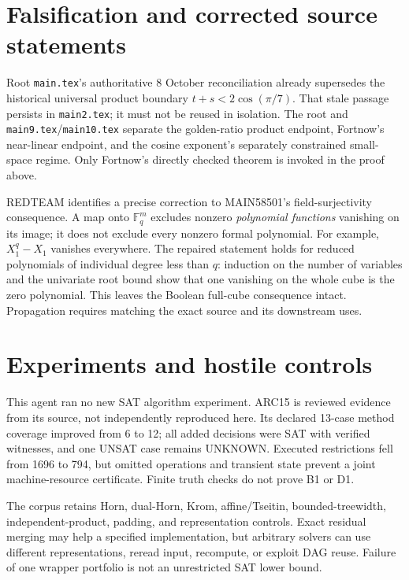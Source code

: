 \documentclass[11pt]{article}
\begin{document}
\section*{Falsification and corrected source statements}
Root \texttt{main.tex}'s authoritative 8 October reconciliation already
supersedes the historical universal product boundary
$t+s<2\cos(\pi/7)$. That stale passage persists in \texttt{main2.tex}; it
must not be reused in isolation. The root and \texttt{main9.tex}/\texttt{main10.tex}
separate the golden-ratio product endpoint, Fortnow's near-linear endpoint,
and the cosine exponent's separately constrained small-space regime.
Only Fortnow's directly checked theorem is invoked in the proof above.

REDTEAM identifies a precise correction to MAIN58501's field-surjectivity
consequence. A map onto $\mathbb F_q^m$ excludes nonzero \emph{polynomial
functions} vanishing on its image; it does not exclude every nonzero formal
polynomial. For example, $X_1^q-X_1$ vanishes everywhere.
The repaired statement holds for reduced polynomials of individual degree
less than $q$: induction on the number of variables and the univariate root
bound show that one vanishing on the whole cube is the zero polynomial.
This leaves the Boolean full-cube consequence intact. Propagation requires
matching the exact source and its downstream uses.

\section*{Experiments and hostile controls}
This agent ran no new SAT algorithm experiment. ARC15 is reviewed evidence
from its source, not independently reproduced here. Its declared 13-case
method coverage improved from 6 to 12; all added decisions were SAT with
verified witnesses, and one UNSAT case remains UNKNOWN. Executed restrictions
fell from 1696 to 794, but omitted operations and transient state prevent a
joint machine-resource certificate. Finite truth checks do not prove B1 or D1.

The corpus retains Horn, dual-Horn, Krom, affine/Tseitin, bounded-treewidth,
independent-product, padding, and representation controls. Exact residual
merging may help a specified implementation, but arbitrary solvers can use
different representations, reread input, recompute, or exploit DAG reuse.
Failure of one wrapper portfolio is not an unrestricted SAT lower bound.
\end{document}
